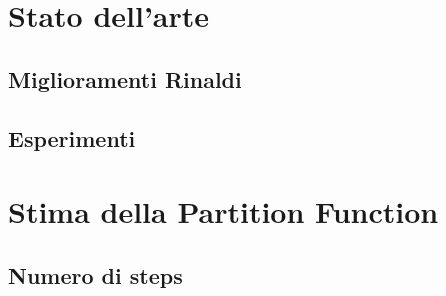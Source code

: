 \section{Stato dell'arte}
\subsection{Miglioramenti Rinaldi}
\subsection{Esperimenti}

\section{Stima della Partition Function}
\subsection{Numero di steps}
